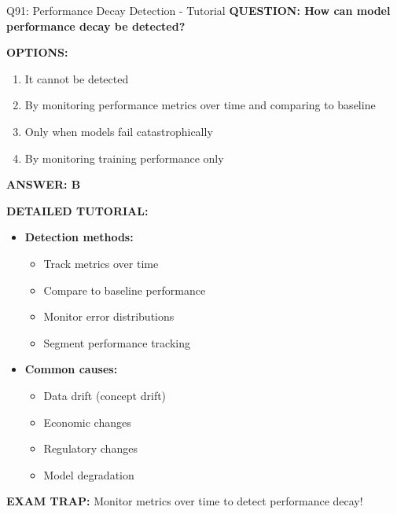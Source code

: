 \documentclass[8pt]{beamer}
\begin{document}
\begin{frame}{Q91: Performance Decay Detection - Tutorial}
	\fontsize{6.5}{7.5}\selectfont
	\textbf{QUESTION: How can model performance decay be detected?}
	
	\vspace{0.1cm}
	\textbf{OPTIONS:}
	\begin{enumerate}
		\item It cannot be detected
		\item By monitoring performance metrics over time and comparing to baseline
		\item Only when models fail catastrophically
		\item By monitoring training performance only
	\end{enumerate}
	
	\vspace{0.1cm}
	\textcolor{myblue}{\textbf{ANSWER: B}}
	
	\vspace{0.1cm}
	\textbf{DETAILED TUTORIAL:}
	\begin{itemize}
		\item \textbf{Detection methods:}
		\begin{itemize}
			\item Track metrics over time
			\item Compare to baseline performance
			\item Monitor error distributions
			\item Segment performance tracking
		\end{itemize}
		\item \textbf{Common causes:}
		\begin{itemize}
			\item Data drift (concept drift)
			\item Economic changes
			\item Regulatory changes
			\item Model degradation
		\end{itemize}
	\end{itemize}
	
	\textcolor{myred}{\textbf{EXAM TRAP:}} Monitor metrics over time to detect \textcolor{myblue}{performance decay}!
\end{frame}
\end{document}
